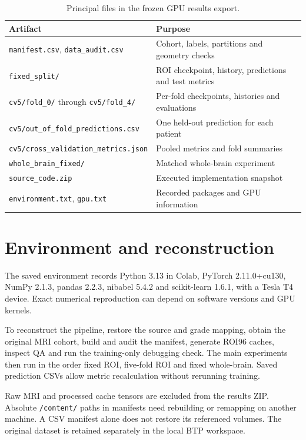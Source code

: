 \documentclass[12pt,a4paper,oneside]{report}
\begin{document}
\begin{table}[htbp]
\centering
\caption{Principal files in the frozen GPU results export.}
\label{tab:artifacts}
\small
\begin{tabularx}{\linewidth}{>{\raggedright\arraybackslash}p{64mm}Y}
\toprule
Artifact & Purpose\\\midrule
\nolinkurl{manifest.csv}, \nolinkurl{data_audit.csv} & Cohort, labels, partitions and geometry checks\\
\nolinkurl{fixed_split/} & ROI checkpoint, history, predictions and test metrics\\
\nolinkurl{cv5/fold_0/} through \nolinkurl{cv5/fold_4/} & Per-fold checkpoints, histories and evaluations\\
\nolinkurl{cv5/out_of_fold_predictions.csv} & One held-out prediction for each patient\\
\nolinkurl{cv5/cross_validation_metrics.json} & Pooled metrics and fold summaries\\
\nolinkurl{whole_brain_fixed/} & Matched whole-brain experiment\\
\nolinkurl{source_code.zip} & Executed implementation snapshot\\
\nolinkurl{environment.txt}, \nolinkurl{gpu.txt} & Recorded packages and GPU information\\\bottomrule
\end{tabularx}
\end{table}

\section{Environment and reconstruction}
The saved environment records Python 3.13 in Colab, PyTorch 2.11.0+cu130, NumPy 2.1.3, pandas 2.2.3, nibabel 5.4.2 and scikit-learn 1.6.1, with a Tesla T4 device. Exact numerical reproduction can depend on software versions and GPU kernels.

To reconstruct the pipeline, restore the source and grade mapping, obtain the original MRI cohort, build and audit the manifest, generate ROI96 caches, inspect QA and run the training-only debugging check. The main experiments then run in the order fixed ROI, five-fold ROI and fixed whole-brain. Saved prediction CSVs allow metric recalculation without rerunning training.

Raw MRI and processed cache tensors are excluded from the results ZIP. Absolute \nolinkurl{/content/} paths in manifests need rebuilding or remapping on another machine. A CSV manifest alone does not restore its referenced volumes. The original dataset is retained separately in the local BTP workspace.
\end{document}
